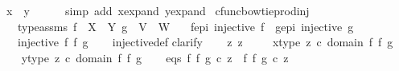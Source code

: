 \begin{isabellebody}
\ {\isachardoublequoteopen}x\ {\isacharequal}{\kern0pt}\ y{\isachardoublequoteclose}\isanewline
\ \ \ \ \isamarkupfalse%
\ {\isacharparenleft}{\kern0pt}simp\ add{\isacharcolon}{\kern0pt}\ x{\isacharunderscore}{\kern0pt}expand\ y{\isacharunderscore}{\kern0pt}expand{\isacharparenright}{\kern0pt}\isanewline
{}\isamarkupfalse%
%
\endisatagproof
{\isafoldproof}%
%
\isadelimproof
\isanewline
%
\endisadelimproof
\isanewline
{}\isamarkupfalse%
\ cfunc{\isacharunderscore}{\kern0pt}bowtieprod{\isacharunderscore}{\kern0pt}inj{\isacharcolon}{\kern0pt}\isanewline
\ \ \ type{\isacharunderscore}{\kern0pt}assms{\isacharcolon}{\kern0pt}\ {\isachardoublequoteopen}f\ {\isacharcolon}{\kern0pt}\ X\ {\isasymrightarrow}\ Y{\isachardoublequoteclose}\ {\isachardoublequoteopen}g\ {\isacharcolon}{\kern0pt}\ V\ {\isasymrightarrow}\ W{\isachardoublequoteclose}\isanewline
\ \ \ f{\isacharunderscore}{\kern0pt}epi{\isacharcolon}{\kern0pt}\ {\isachardoublequoteopen}injective\ f{\isachardoublequoteclose}\ \ g{\isacharunderscore}{\kern0pt}epi{\isacharcolon}{\kern0pt}\ {\isachardoublequoteopen}injective\ g{\isachardoublequoteclose}\isanewline
\ \ \ {\isachardoublequoteopen}injective\ {\isacharparenleft}{\kern0pt}f\ {\isasymbowtie}\isactrlsub f\ g{\isacharparenright}{\kern0pt}{\isachardoublequoteclose}\isanewline
%
\isadelimproof
\ \ %
\endisadelimproof
%
\isatagproof
{}\isamarkupfalse%
\ injective{\isacharunderscore}{\kern0pt}def\isanewline
{}\isamarkupfalse%
{\isacharparenleft}{\kern0pt}clarify{\isacharparenright}{\kern0pt}\isanewline
\ \ \isamarkupfalse%
\ z{}\ z{}\ \isanewline
\ \ \isamarkupfalse%
\ x{\isacharunderscore}{\kern0pt}type{\isacharcolon}{\kern0pt}\ {\isachardoublequoteopen}z{}\ {\isasymin}\isactrlsub c\ domain\ {\isacharparenleft}{\kern0pt}f\ {\isasymbowtie}\isactrlsub f\ g{\isacharparenright}{\kern0pt}{\isachardoublequoteclose}\isanewline
\ \ \isamarkupfalse%
\ y{\isacharunderscore}{\kern0pt}type{\isacharcolon}{\kern0pt}\ {\isachardoublequoteopen}z{}\ {\isasymin}\isactrlsub c\ domain\ {\isacharparenleft}{\kern0pt}f\ {\isasymbowtie}\isactrlsub f\ g{\isacharparenright}{\kern0pt}{\isachardoublequoteclose}\isanewline
\ \ \isamarkupfalse%
\ eqs{\isacharcolon}{\kern0pt}\ {\isachardoublequoteopen}{\isacharparenleft}{\kern0pt}f\ {\isasymbowtie}\isactrlsub f\ g{\isacharparenright}{\kern0pt}\ {\isasymcirc}\isactrlsub c\ z{}\ {\isacharequal}{\kern0pt}\ {\isacharparenleft}{\kern0pt}f\ {\isasymbowtie}\isactrlsub f\ g{\isacharparenright}{\kern0pt}\ {\isasymcirc}\isactrlsub c\ z{}{\isachardoublequoteclose}\isanewline

\end{isabellebody}

